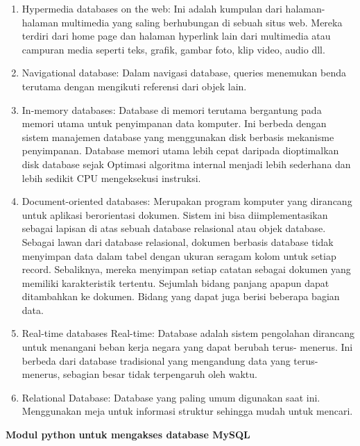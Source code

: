 \begin{enumerate}
\noindent 
\item Hypermedia databases on the web: Ini adalah kumpulan dari halaman-halaman multimedia yang saling berhubungan di sebuah situs web. Mereka terdiri dari home page dan halaman hyperlink lain dari multimedia atau campuran media seperti teks, grafik, gambar foto, klip video, audio dll. \par
\noindent 
\item Navigational database: Dalam navigasi database, queries menemukan benda terutama dengan mengikuti referensi dari objek lain. \par
\noindent 
\item In-memory databases: Database di memori terutama bergantung pada memori utama untuk penyimpanan data komputer. Ini berbeda dengan sistem manajemen database yang menggunakan disk berbasis mekanisme penyimpanan. Database memori utama lebih cepat daripada dioptimalkan disk database sejak Optimasi algoritma internal menjadi lebih sederhana dan lebih sedikit CPU mengeksekusi instruksi. \par
\noindent 
\item Document-oriented databases: Merupakan program komputer yang dirancang untuk aplikasi berorientasi dokumen. Sistem ini bisa diimplementasikan sebagai lapisan di atas sebuah database relasional atau objek database. Sebagai lawan dari database relasional, dokumen berbasis database tidak menyimpan data dalam tabel dengan ukuran seragam kolom untuk setiap record. Sebaliknya, mereka menyimpan setiap catatan sebagai dokumen yang memiliki karakteristik tertentu. Sejumlah bidang panjang apapun dapat ditambahkan ke dokumen. Bidang yang dapat juga berisi beberapa bagian data. \par
\noindent 
\item Real-time databases Real-time: Database adalah sistem pengolahan dirancang untuk menangani beban kerja negara yang dapat berubah terus- menerus. Ini berbeda dari database tradisional yang mengandung data yang terus- menerus, sebagian besar tidak terpengaruh oleh waktu. \par
\noindent 
\item Relational Database: Database yang paling umum digunakan saat ini. Menggunakan meja untuk informasi struktur sehingga mudah untuk mencari.\end{enumerate}
 \par
\vspace{12pt}
\noindent 
\textbf{Modul python}\textbf{ untuk mengakses database MySQL} \par
